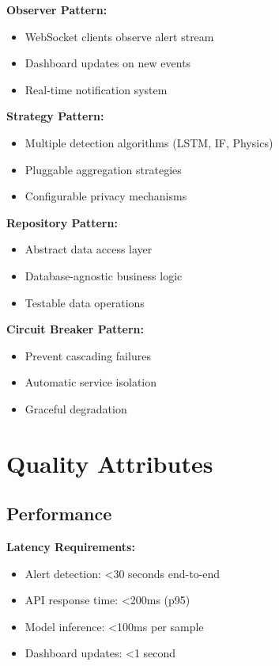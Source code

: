 \documentclass[12pt,a4paper]{article}
\begin{document}
\textbf{Observer Pattern:}
\begin{itemize}[leftmargin=1cm,itemsep=0pt]
    \item WebSocket clients observe alert stream
    \item Dashboard updates on new events
    \item Real-time notification system
\end{itemize}

\textbf{Strategy Pattern:}
\begin{itemize}[leftmargin=1cm,itemsep=0pt]
    \item Multiple detection algorithms (LSTM, IF, Physics)
    \item Pluggable aggregation strategies
    \item Configurable privacy mechanisms
\end{itemize}

\textbf{Repository Pattern:}
\begin{itemize}[leftmargin=1cm,itemsep=0pt]
    \item Abstract data access layer
    \item Database-agnostic business logic
    \item Testable data operations
\end{itemize}

\textbf{Circuit Breaker Pattern:}
\begin{itemize}[leftmargin=1cm,itemsep=0pt]
    \item Prevent cascading failures
    \item Automatic service isolation
    \item Graceful degradation
\end{itemize}

\section{Quality Attributes}

\subsection{Performance}

\textbf{Latency Requirements:}
\begin{itemize}[leftmargin=1cm,itemsep=0pt]
    \item Alert detection: <30 seconds end-to-end
    \item API response time: <200ms (p95)
    \item Model inference: <100ms per sample
    \item Dashboard updates: <1 second
\end{itemize}
\end{document}

